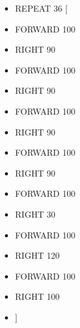 \begin{minipage}{0.45\textwidth}
\begin{itemize}[itemsep=-3pt,parsep=2pt]
\item[] \hspace{0.5cm} REPEAT 36 [
\item[] \hspace{0.5cm} 	FORWARD 100
\item[] \hspace{0.5cm} 	RIGHT 90
\item[] \hspace{0.5cm} 	FORWARD 100
\item[] \hspace{0.5cm} 	RIGHT 90
\item[] \hspace{0.5cm} 	FORWARD 100
\item[] \hspace{0.5cm} 	RIGHT 90
\item[] \hspace{0.5cm} 	FORWARD 100
\item[] \hspace{0.5cm} 	RIGHT 90
\item[] \hspace{0.5cm} 	FORWARD 100
\item[] \hspace{0.5cm} 	RIGHT 30
\item[] \hspace{0.5cm} 	FORWARD 100
\item[] \hspace{0.5cm} 	RIGHT 120
\item[] \hspace{0.5cm} 	FORWARD 100
\item[] \hspace{0.5cm} 	RIGHT 100
\item[] \hspace{0.5cm} 	]          
\end{itemize}          	          
\end{minipage}

